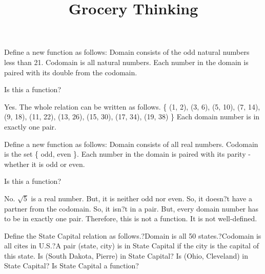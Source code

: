 \documentclass{ximera}
\title{Grocery Thinking}
\begin{document}
\begin{abstract}
\end{abstract}

\maketitle


\begin{question}

Define a new function as follows:
Domain consists of the odd natural numbers less than 21.
Codomain is all natural numbers.
Each number in the domain is paired with its double from the codomain.

Is this a function?
\begin{multipleChoice}
\end{multipleChoice}
\begin{feedback}
Yes. The whole relation can be written as follows.
\{ (1, 2), (3, 6), (5, 10), (7, 14), (9, 18), (11, 22), (13, 26), (15, 30), (17, 34), (19, 38) \}
Each domain number is in exactly one pair.
\end{feedback}


\end{question}






\begin{question}

Define a new function as follows:
Domain consists of all real numbers.
Codomain is the set \{ odd, even \}.
Each number in the domain is paired with its parity - whether it is odd or even.

Is this a function?
\begin{multipleChoice}
\end{multipleChoice}
\begin{feedback}
No. $\sqrt{5}$ is a real number. But, it is neither odd nor even. So, it doesn?t have a partner from the codomain. So, it isn?t in a pair. But, every domain number has to be in exactly one pair.
Therefore, this is not a function. It is not well-defined.
\end{feedback}


\end{question}





Define the State Capital relation as follows.?Domain is all 50 states.?Codomain is all cites in U.S.?A pair (state, city) is in State Capital if the city is the capital of this state.
Is (South Dakota, Pierre) in State Capital?
Is (Ohio, Cleveland) in State Capital?
Is State Capital a function?
\end{document}
